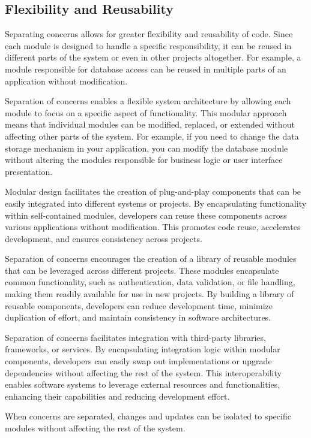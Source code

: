 \subsection{Flexibility and Reusability} 
Separating concerns allows for greater flexibility and reusability of code.
Since each module is designed to handle a specific responsibility, it can be reused in different parts of the system or even in other projects altogether.
For example, a module responsible for database access can be reused in multiple parts of an application without modification.
\par
Separation of concerns enables a flexible system architecture by allowing each module to focus on a specific aspect of functionality.
This modular approach means that individual modules can be modified, replaced, or extended without affecting other parts of the system.
For example, if you need to change the data storage mechanism in your application, you can modify the database module without altering the modules responsible for business logic or user interface presentation.
\par
Modular design facilitates the creation of plug-and-play components that can be easily integrated into different systems or projects.
By encapsulating functionality within self-contained modules, developers can reuse these components across various applications without modification.
This promotes code reuse, accelerates development, and ensures consistency across projects.
\par
Separation of concerns encourages the creation of a library of reusable modules that can be leveraged across different projects.
These modules encapsulate common functionality, such as authentication, data validation, or file handling, making them readily available for use in new projects.
By building a library of reusable components, developers can reduce development time, minimize duplication of effort, and maintain consistency in software architectures.
\par
Separation of concerns facilitates integration with third-party libraries, frameworks, or services.
By encapsulating integration logic within modular components, developers can easily swap out implementations or upgrade dependencies without affecting the rest of the system.
This interoperability enables software systems to leverage external resources and functionalities, enhancing their capabilities and reducing development effort.
\par
When concerns are separated, changes and updates can be isolated to specific modules without affecting the rest of the system.
